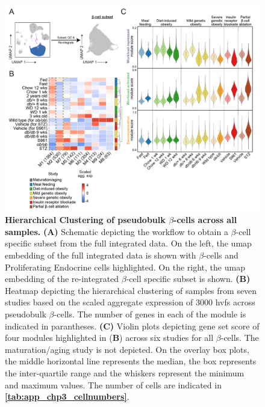 \begin{figure}[t!]
\centering
\includegraphics[width=\linewidth]{Chapter5/Fig/F3-3-01.png}
\caption[Hierarchical clustering of pseudobulk $\beta$-cells across all samples]{\textbf{Hierarchical Clustering of pseudobulk $\beta$-cells across all samples.} \textbf{(A)} Schematic depicting the workflow to obtain a  $\beta$-cell specific subset from the full integrated data. On the left, the \gls{umap} embedding of the full integrated data is shown with $\beta$-cells and Proliferating Endocrine cells highlighted. On the right, the \gls{umap} embedding of the re-integrated $\beta$-cell specific subset is shown. \textbf{(B)} Heatmap depicting the hierarchical clustering of samples from seven studies based on the scaled aggregate expression of 3000 \glspl{hvf} across pseudobulk $\beta$-cells. The number of genes in each of the module is indicated in parantheses. \textbf{(C)} Violin plots depicting gene set score of four modules highlighted in (\textbf{B}) across six studies for all $\beta$-cells. The maturation/aging study is not depicted. On the overlay box plots, the middle horizontal line represents the median, the box represents the inter-quartile range and the whiskers represent the minimum and maximum values. The number of cells are indicated in \textbf{\autoref{tab:app_chp3_cellnumbers}}.}
\label{fig:chp3_pseudobulk}
\vspace{-10pt}
\end{figure}

